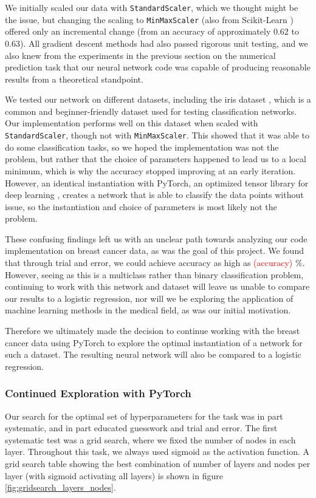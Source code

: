 We initially scaled our data with \texttt{StandardScaler}, which we thought might be the issue, but changing the scaling to \texttt{MinMaxScaler} (also from Scikit-Learn \cite{sklearnScaling}) offered only an incremental change (from an accuracy of approximately 0.62 to 0.63). All gradient descent methods had also passed rigorous unit testing, and we also knew from the experiments in the previous section on the numerical prediction task that our neural network code was capable of producing reasonable results from a theoretical standpoint. 

We tested our network on different datasets, including the iris dataset \cite{irisdataset}, which is a common and beginner-friendly dataset used for testing classification networks. Our implementation performs well on this dataset when scaled with \texttt{StandardScaler}, though not with \texttt{MinMaxScaler}. This showed that it was able to do some classification tasks, so we hoped the implementation was not the problem, but rather that the choice of parameters happened to lead us to a local minimum, which is why the accuracy stopped improving at an early iteration. However, an identical instantiation with PyTorch, an optimized tensor library for deep learning \cite{pytorch}, creates a network that is able to classify the data points without issue, so the instantiation and choice of parameters is most likely not the problem.

These confusing findings left us with an unclear path towards analyzing our code implementation on breast cancer data, as was the goal of this project. We found that through trial and error, we could achieve accuracy as high as \textcolor{red}{(accuracy)} \%. However, seeing as this is a multiclass rather than binary classification problem, continuing to work with this network and dataset will leave us unable to compare our results to a logistic regression, nor will we be exploring the application of machine learning methods in the medical field, as was our initial motivation.

Therefore we ultimately made the decision to continue working with the breast cancer data using PyTorch to explore the optimal instantiation of a network for such a dataset. The resulting neural network will also be compared to a logistic regression. 

\subsubsection{Continued Exploration with PyTorch}
Our search for the optimal set of hyperparameters for the task was in part systematic, and in part educated guesswork and trial and error. The first systematic test was a grid search, where we fixed the number of nodes in each layer. Throughout this task, we always used sigmoid as the activation function. A grid search table showing the best combination of number of layers and nodes per layer (with sigmoid activating all layers) is shown in figure \ref{fig:gridsearch_layers_nodes}. 

